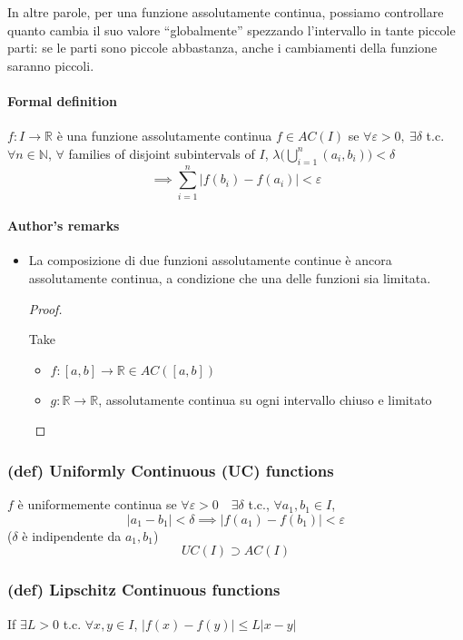 In altre parole, per una funzione assolutamente continua, possiamo controllare quanto cambia il suo valore “globalmente” spezzando l’intervallo in tante piccole parti: se le parti sono piccole abbastanza, anche i cambiamenti della funzione saranno piccoli.
\paragraph{Formal definition}
$f:I\to \mathbb R$ è una funzione assolutamente continua $f\in AC(I)$ se $\forall \varepsilon>0,\ \exists \delta$ t.c. $\forall n\in \mathbb N$, $\forall$ families of disjoint subintervals of $I$, $\lambda\Big (\bigcup_{i=1}^n(a_i,b_i)\Big )<\delta$
$$\implies \sum_{i=1}^n|f(b_i)-f(a_i)|<\varepsilon$$
\paragraph{Author's remarks}
\begin{itemize}
    \item La composizione di due funzioni assolutamente continue è ancora assolutamente continua, a condizione che una delle funzioni sia limitata.
    \begin{proof}\ 
    
    Take
    \begin{itemize}
        \item $f:[a,b]\to \mathbb R\in AC([a,b])$
        \item $g:\mathbb R\to \mathbb R$, assolutamente continua su ogni intervallo chiuso e limitato
    \end{itemize}
    
    
    \end{proof}
\end{itemize}
\subsubsection{(def) Uniformly Continuous (UC) functions}
$f$ è uniformemente continua se $\forall \varepsilon>0\quad \exists \delta $ t.c., $\forall a_1,b_1\in I$,
$$|a_1-b_1|<\delta \implies |f(a_1)-f(b_1)|<\varepsilon$$
($\delta$ è indipendente da $a_1,b_1$)
$$UC(I)\supset AC(I)$$
\subsubsection{(def) Lipschitz Continuous functions}
If $\exists L>0$ t.c. $\forall x,y\in I$, $|f(x)-f(y)|\leq L|x-y|$

